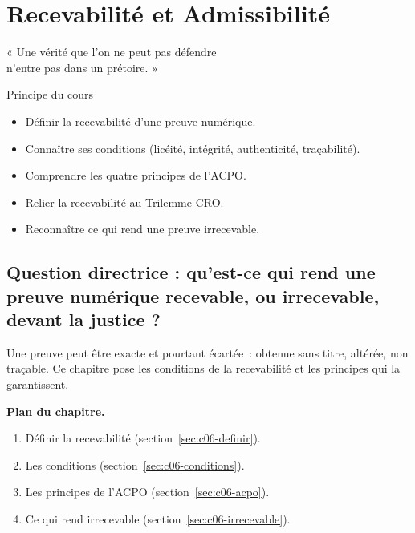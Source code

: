
\chapter{Recevabilité et Admissibilité}
\label{chap:recevabilite}

\epigraph{%
    « Une vérité que l'on ne peut pas défendre\\
    n'entre pas dans un prétoire. »%
}{Principe du cours}


\begin{boxobjectifs}
\begin{itemize}
    \item Définir la recevabilité d'une preuve numérique.
    \item Connaître ses conditions (licéité, intégrité, authenticité, traçabilité).
    \item Comprendre les quatre principes de l'ACPO.
    \item Relier la recevabilité au Trilemme CRO.
    \item Reconnaître ce qui rend une preuve irrecevable.
\end{itemize}
\end{boxobjectifs}

\bigskip

\section*{Question directrice : qu'est-ce qui rend une preuve numérique recevable, ou irrecevable, devant la justice ?}

Une preuve peut être exacte et pourtant écartée~: obtenue sans titre,
altérée, non traçable. Ce chapitre pose les conditions de la recevabilité et
les principes qui la garantissent.

\medskip
\textbf{Plan du chapitre.}
\begin{enumerate}
    \item Définir la recevabilité (section~\ref{sec:c06-definir}).
    \item Les conditions (section~\ref{sec:c06-conditions}).
    \item Les principes de l'ACPO (section~\ref{sec:c06-acpo}).
    \item Ce qui rend irrecevable (section~\ref{sec:c06-irrecevable}).
\end{enumerate}

